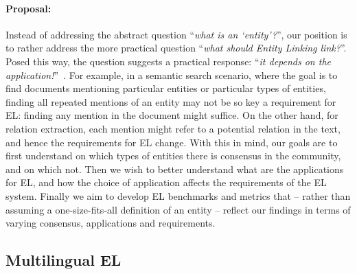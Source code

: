 \documentclass[sigconf]{acmart}
\begin{document}
\paragraph{Proposal:} Instead of addressing the abstract question ``\textit{what is an `entity'?}'', our position is to rather address the more practical question ``\textit{what should Entity Linking link?}''. Posed this way, the question suggests a practical response: ``\textit{it depends on the application!}''~\cite{ourAMW2018}. For example, in a semantic search scenario, where the goal is to find documents mentioning particular entities or particular types of entities, finding all repeated mentions of an entity may not be so key a requirement for EL: finding any mention in the document might suffice. On the other hand, for relation extraction, each mention might refer to a potential relation in the text, and hence the requirements for EL change. With this in mind, our goals are to first understand on which types of entities there is consensus in the community, and on which not. Then we wish to better understand what are the applications for EL, and how the choice of application affects the requirements of the EL system. Finally we aim to develop EL benchmarks and metrics that -- rather than assuming a one-size-fits-all definition of an entity -- reflect our findings in terms of varying consensus, applications and requirements.

\subsection{Multilingual EL}
\end{document}
